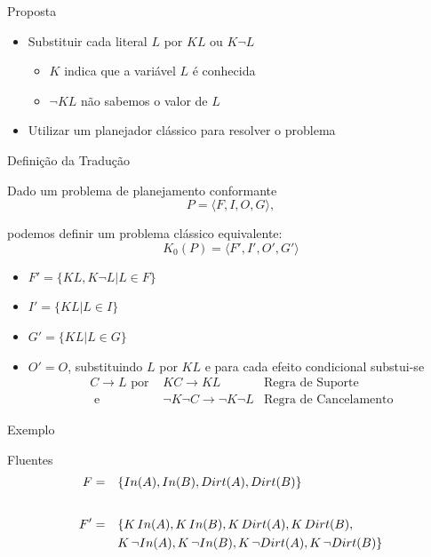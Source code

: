 \begin{frame}{Proposta}
    \begin{itemize}
    \item Substituir cada literal $L$ por $ KL$ ou $K \lnot L$
        \begin{itemize}
            \item $K$ indica que a variável $L$ é conhecida 
            \item $\lnot KL$ não sabemos o valor de $L$
        \end{itemize}  
    \item Utilizar um planejador clássico para resolver o problema
    \end{itemize}  
\end{frame}

\begin{frame}{Definição da Tradução}

    Dado um problema de planejamento conformante\\
    \[P=\langle F, I, O, G\rangle,\]
    
    podemos definir um problema clássico equivalente:\\
    \[K_0(P)=\langle F', I', O', G'\rangle\]
    \begin{itemize}
        \item $F' = \{ KL, K \lnot L | L \in F \}$
        \item $I' = \{ KL | L \in I \}$
        \item $G' = \{ KL | L \in G \}$
        \item $O' = O$, substituindo $L$ por $KL$ e para cada efeito condicional substui-se 
        \begin{align*}C \rightarrow L \text{ por } & KC \rightarrow KL &\text{Regra de Suporte} \\ 
                                        \text{ e } & \lnot K \lnot C \rightarrow \lnot K \lnot L& \text{Regra de Cancelamento}
        \end{align*}
    \end{itemize}  
\end{frame}

\begin{frame}{Exemplo}
     \begin{block}{Fluentes}
        \begin{align*}
                F = \quad  & \{ In(A),In(B),Dirt(A),Dirt(B) \} \\ \intertext{}
                F' = \quad  & \{ K\, In(A),K\, In(B),K\, Dirt(A),K\, Dirt(B),\\
                            & K\,\lnot In(A),K\,\lnot In(B),K\,\lnot Dirt(A),K\,\lnot Dirt(B) \}\\
        \end{align*}
    \end{block}    
\end{frame}

